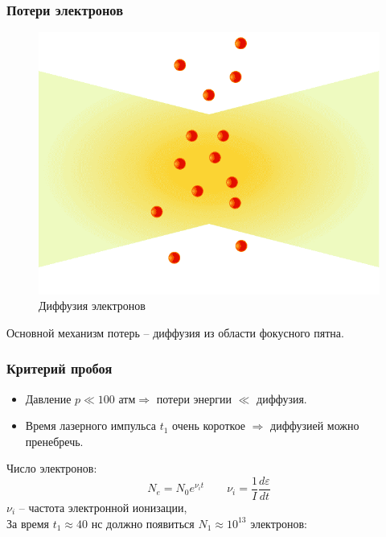 \documentclass{beamer}
\begin{document}
	\begin{frame}
		\frametitle{Потери электронов}
		
		\begin{figure}
			\centering
			\includegraphics[width=0.5\linewidth]{res/diffusion.png}
			\caption*{Диффузия электронов}
		\end{figure}
		
		Основной механизм потерь -- диффузия из области фокусного пятна.
				
	\end{frame}

		
	\begin{frame}
		\frametitle{Критерий пробоя}
		\begin{itemize}
			\item Давление $p \ll 100 \text{ атм} \Rightarrow$ потери энергии $\ll$ диффузия.
			\item Время лазерного импульса $t_1$ очень короткое $\Rightarrow$ диффузией можно пренебречь.
			
		\end{itemize}
		
		
		Число электронов:
		$$ N_e = N_0 e^{\nu_i t} \qquad \nu_i = \frac{1}{I} \frac{d\varepsilon}{dt}$$
		$\nu_i$ -- частота электронной ионизации,\\
		
		За время $t_1 \approx 40$ нс должно появиться $N_1 \approx 10^{13}$ электронов:
		
		\begin{center}
			\boxed{ \nu_i > \frac{\ln( N_1 / N_0)}{t_1}.}
		\end{center}
		
	\end{frame}
	
\end{document}
